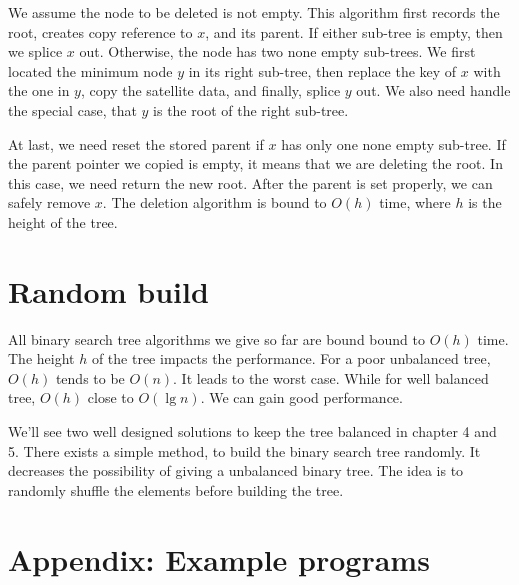 \documentclass[b5paper]{article}
\begin{document}
We assume the node to be deleted is not empty. This algorithm first records the root, creates copy reference to $x$, and its parent. If either sub-tree is empty, then we splice $x$ out. Otherwise, the node has two none empty sub-trees. We first located the minimum node $y$ in its right sub-tree, then replace the key of $x$ with the one in $y$, copy the satellite data, and finally, splice $y$ out. We also need handle the special case, that $y$ is the root of the right sub-tree.

At last, we need reset the stored parent if $x$ has only one none empty sub-tree. If the parent pointer we copied is empty, it means that we are deleting the root. In this case, we need return the new root. After the parent is set properly, we can safely remove $x$. The deletion algorithm is bound to $O(h)$ time, where $h$ is the height of the tree.

\begin{Exercise}


\end{Exercise}

\section{Random build}
All binary search tree algorithms we give so far are bound bound to $O(h)$ time. The height $h$ of the tree impacts the performance. For a poor unbalanced tree, $O(h)$ tends to be $O(n)$. It leads to the worst case. While for well balanced tree, $O(h)$ close to $O(\lg n)$. We can gain good performance.

We'll see two well designed solutions to keep the tree balanced in chapter 4 and 5. There exists a simple method, to build the binary search tree randomly\cite{CLRS}. It decreases the possibility of giving a unbalanced binary tree. The idea is to randomly shuffle the elements before building the tree.

\begin{Exercise}
\end{Exercise}

\section{Appendix: Example programs}
\end{document}
